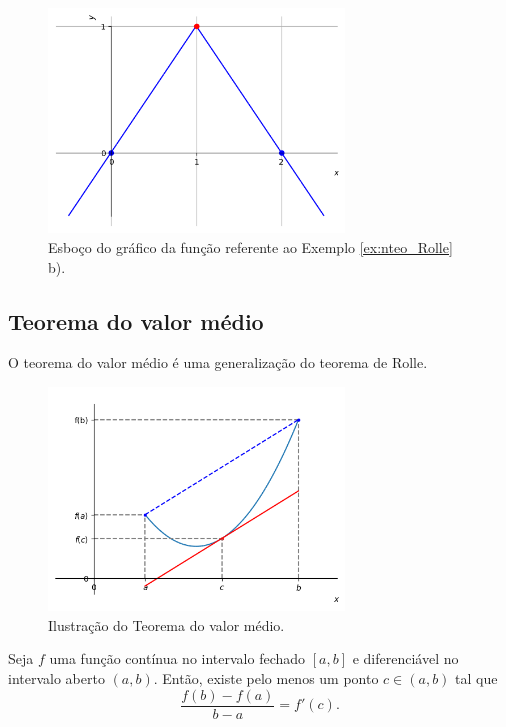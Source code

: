 \begin{ex}
\begin{enumerate}[a)]
  \begin{figure}[H]
    \centering
    \includegraphics[width=0.7\textwidth]{./cap_apderiv/dados/fig_ex_nteo_Rolle_nderiv/fig_ex_nteo_Rolle_nderiv}
    \caption{Esboço do gráfico da função referente ao Exemplo \ref{ex:nteo_Rolle} b).}
    \label{fig:ex_nteo_Rolle_nderiv}
  \end{figure}  
  \end{enumerate}
\end{ex}

\subsection{Teorema do valor médio}

O teorema do valor médio é uma generalização do teorema de Rolle.

\begin{figure}[H]
  \centering
  \includegraphics[width=0.7\textwidth]{./cap_apderiv/dados/fig_teo_valmed/fig_teo_valmed}
  \caption{Ilustração do Teorema do valor médio.}
  \label{fig:teo_valor_medio}
\end{figure}

\begin{teo}
  Seja $f$ uma função contínua no intervalo fechado $[a,b]$ e diferenciável no intervalo aberto $(a,b)$. Então, existe pelo menos um ponto $c\in (a,b)$ tal que
  \begin{equation}
    \frac{f(b)-f(a)}{b-a}=f'(c).
  \end{equation}
\end{teo}

